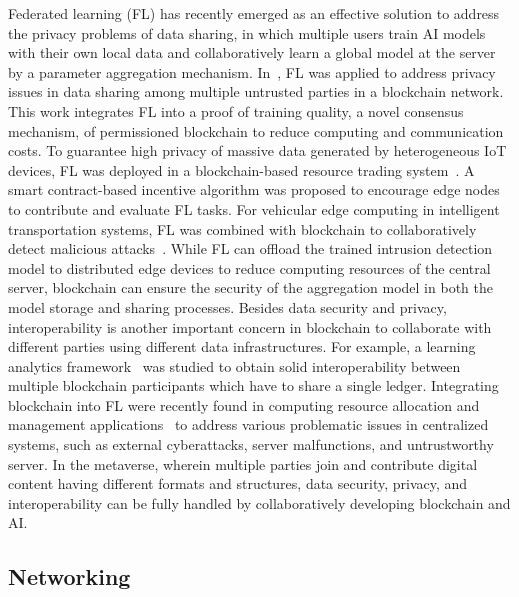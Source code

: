 \documentclass[journal]{IEEEtran}
\begin{document}
Federated learning (FL) has recently emerged as an effective solution to address the privacy problems of data sharing, in which multiple users train AI models with their own local data and collaboratively learn a global model at the server by a parameter aggregation mechanism.
In~\cite{lu2020blockchain}, FL was applied to address privacy issues in data sharing among multiple untrusted parties in a blockchain network.
This work integrates FL into a proof of training quality, a novel consensus mechanism, of permissioned blockchain to reduce computing and communication costs.
To guarantee high privacy of massive data generated by heterogeneous IoT devices, FL was deployed in a blockchain-based resource trading system~\cite{fan2021hybrid}. 
A smart contract-based incentive algorithm was proposed to encourage edge nodes to contribute and evaluate FL tasks.
For vehicular edge computing in intelligent transportation systems, FL was combined with blockchain to collaboratively detect malicious attacks~\cite{liu2021blockchain}.
While FL can offload the trained intrusion detection model to distributed edge devices to reduce computing resources of the central server, blockchain can ensure the security of the aggregation model in both the model storage and sharing processes.
Besides data security and privacy, interoperability is another important concern in blockchain to collaborate with different parties using different data infrastructures.
For example, a learning analytics framework~\cite{ocheja2018connecting} was studied to obtain solid interoperability between multiple blockchain participants which have to share a single ledger.
Integrating blockchain into FL were recently found in computing resource allocation and management applications~\cite{umer2021stbfl,li2021blockchain} to address various problematic issues in centralized systems, such as external cyberattacks, server malfunctions, and untrustworthy server.
In the metaverse, wherein multiple parties join and contribute digital content having different formats and structures, data security, privacy, and interoperability can be fully handled by collaboratively developing blockchain and AI.

\subsection{Networking}
\end{document}

